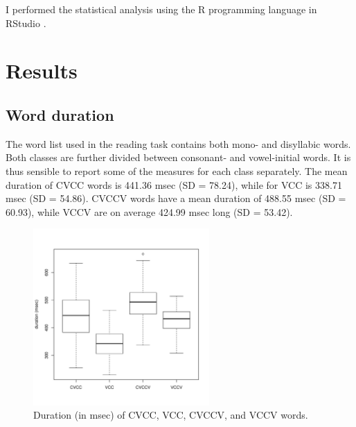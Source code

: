 \documentclass[11pt,a4paper,openany]{memoir}\usepackage[]{graphicx}\usepackage[]{color}
\newenvironment{knitrout}{}{} %
\begin{document}
I performed the statistical analysis using the R programming language \citep{r-core-team2015} in RStudio \citep{rstudio-team2015}.
















\chapter{Results}
\label{c:results}

\section{Word duration}

The word list used in the reading task contains both mono- and disyllabic words.
Both classes are further divided between consonant- and vowel-initial words.
It is thus sensible to report some of the measures for each class separately.
The mean duration of CVCC words is 441.36 msec (SD = 78.24), while for VCC is 338.71 msec (SD = 54.86).
CVCCV words have a mean duration of 488.55 msec (SD = 60.93), while VCCV are on average 424.99 msec long (SD = 53.42).

\begin{figure}
\centering
\begin{knitrout}
\color{fgcolor}
\includegraphics[width=0.6\textwidth]{img/word-duration-1} 

\end{knitrout}
\caption{Duration (in msec) of CVCC, VCC, CVCCV, and VCCV words.}
\label{f:worddur}
\end{figure}
\end{document}
